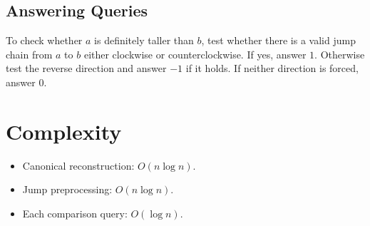 \documentclass[11pt,a4paper]{article}
\begin{document}
\subsection{Answering Queries}
To check whether $a$ is definitely taller than $b$, test whether there is a valid jump chain from $a$ to $b$ either clockwise or counterclockwise. If yes, answer $1$. Otherwise test the reverse direction and answer $-1$ if it holds. If neither direction is forced, answer $0$.

\section{Complexity}
\begin{itemize}
  \item Canonical reconstruction: $O(n \log n)$.
  \item Jump preprocessing: $O(n \log n)$.
  \item Each comparison query: $O(\log n)$.
\end{itemize}
\end{document}
